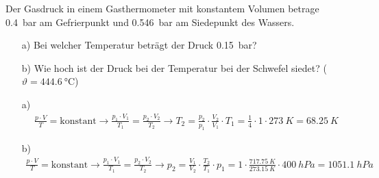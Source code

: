 
\def\DRUCK{0.15}
\begin{aufgabe}
	Der Gasdruck in einem Gasthermometer mit konstantem Volumen betrage \SI{0.4}{bar} am Gefrierpunkt
	und \SI{0.546}{bar} am Siedepunkt des Wassers.
	\begin{itemize}
		\item [a)] Bei welcher Temperatur beträgt der Druck \SI{\DRUCK}{bar}?
		\item [b)] Wie hoch ist der Druck bei der Temperatur bei der Schwefel siedet? ($\vartheta=\SI{444.6}{\celsius}$)
	\end{itemize}
	\begin{loesung}
		\begin{itemize}
			\item [a)]
				\begin{eqnarray*}
					\frac{p\cdot V}{T}=\text{konstant}\to\frac{p_1\cdot V_1}{T_1}=\frac{p_2\cdot V_2}{T_2}\to T_2=\frac{p_2}{p_1}\cdot\frac{V_2}{V_1}\cdot T_1 =\frac{1}{4}\cdot 1\cdot \SI{273}{K}=\SI{68.25}{K} 
				\end{eqnarray*}
			\item[b)]
				\begin{eqnarray*}
					\frac{p\cdot V}{T}=\text{konstant}\to\frac{p_1\cdot V_1}{T_1}=\frac{p_2\cdot V_2}{T_2}\to p_2=\frac{V_1}{V_2}\cdot\frac{T_2}{T_1}\cdot p_1=1\cdot\frac{\SI{717.75}{K}}{\SI{273.15}{K}}\cdot\SI{400}{hPa}=\SI{1051.1}{hPa} 
				\end{eqnarray*}
		\end{itemize}
	\end{loesung}
\end{aufgabe}
